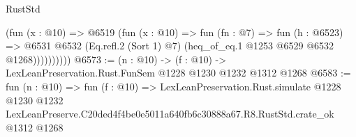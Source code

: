 \begin{lexlean}{RustStd}
\begin{coremodule}
                  (fun (x : @10) =>
                  @6519
                    (fun (x : @10) =>
                    fun (fn : @7) =>
                    fun (h : @6523) =>
                    @6531
                      @6532
                      (Eq.refl.{2} (Sort 1) @7)
                      (heq_of_eq.{1} @1253 @6529 @6532 @1268))))))))))
@6573 := (n : @10) -> (f : @10) -> LexLeanPreservation.Rust.FunSem @1228 @1230 @1232 @1312 @1268
@6583 := fun (n : @10) =>
  fun (f : @10) =>
  LexLeanPreservation.Rust.simulate
    @1228
    @1230
    @1232
    LexLeanPreserve.C20ded4f4be0e5011a640fb6c30888a67.R8.RustStd.crate_ok
    @1312
    @1268
\end{coremodule}
\end{lexlean}
